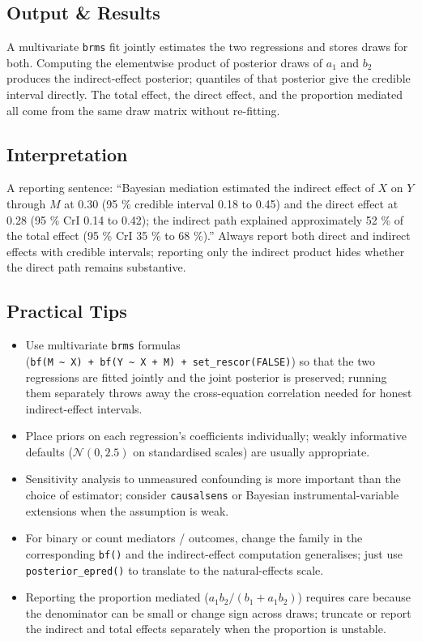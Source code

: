 \documentclass[
]{article}
\providecommand{\tightlist}{%
  \setlength{\itemsep}{0pt}\setlength{\parskip}{0pt}}
\begin{document}
\subsection{Output \& Results}\label{output-results}

A multivariate \texttt{brms} fit jointly estimates the two regressions
and stores draws for both. Computing the elementwise product of
posterior draws of \(a_1\) and \(b_2\) produces the indirect-effect
posterior; quantiles of that posterior give the credible interval
directly. The total effect, the direct effect, and the proportion
mediated all come from the same draw matrix without re-fitting.

\subsection{Interpretation}\label{interpretation}

A reporting sentence: ``Bayesian mediation estimated the indirect effect
of \(X\) on \(Y\) through \(M\) at 0.30 (95 \% credible interval 0.18 to
0.45) and the direct effect at 0.28 (95 \% CrI 0.14 to 0.42); the
indirect path explained approximately 52 \% of the total effect (95 \%
CrI 35 \% to 68 \%).'' Always report both direct and indirect effects
with credible intervals; reporting only the indirect product hides
whether the direct path remains substantive.

\subsection{Practical Tips}\label{practical-tips}

\begin{itemize}
\tightlist
\item
  Use multivariate \texttt{brms} formulas
  (\texttt{bf(M\ \textasciitilde{}\ X)\ +\ bf(Y\ \textasciitilde{}\ X\ +\ M)\ +\ set\_rescor(FALSE)})
  so that the two regressions are fitted jointly and the joint posterior
  is preserved; running them separately throws away the cross-equation
  correlation needed for honest indirect-effect intervals.
\item
  Place priors on each regression's coefficients individually; weakly
  informative defaults (\(\mathcal N(0, 2.5)\) on standardised scales)
  are usually appropriate.
\item
  Sensitivity analysis to unmeasured confounding is more important than
  the choice of estimator; consider \texttt{causalsens} or Bayesian
  instrumental-variable extensions when the assumption is weak.
\item
  For binary or count mediators / outcomes, change the family in the
  corresponding \texttt{bf()} and the indirect-effect computation
  generalises; just use \texttt{posterior\_epred()} to translate to the
  natural-effects scale.
\item
  Reporting the proportion mediated (\(a_1 b_2 / (b_1 + a_1 b_2)\))
  requires care because the denominator can be small or change sign
  across draws; truncate or report the indirect and total effects
  separately when the proportion is unstable.
\end{itemize}
\end{document}
